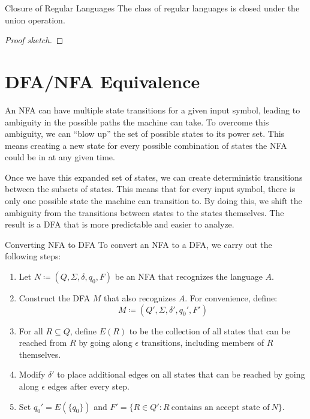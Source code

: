 \documentclass[12pt]{report}
\begin{document}
\begin{thmbox}{Closure of Regular Languages}{}
    The class of regular languages is closed under the union operation.
    \tcblower
    \begin{proof}[Proof sketch]
    \end{proof}
\end{thmbox}


\section{DFA/NFA Equivalence}

An NFA can have multiple state transitions for a given input symbol, leading to ambiguity in the possible paths the machine can take. To overcome this ambiguity, we can ``blow up'' the set of possible states to its power set. This means creating a new state for every possible combination of states the NFA could be in at any given time.

Once we have this expanded set of states, we can create deterministic transitions between the subsets of states. This means that for every input symbol, there is only one possible state the machine can transition to. By doing this, we shift the ambiguity from the transitions between states to the states themselves. The result is a DFA that is more predictable and easier to analyze.

\begin{tecbox}{Converting NFA to DFA}{}
    To convert an NFA to a DFA, we carry out the following steps:
    \begin{enumerate}
        \item Let $N \coloneq (Q, \Sigma, \delta, q_0, F)$ be an NFA that recognizes the language $A$.
        \item Construct the DFA $M$ that also recognizes $A$. For convenience, define:
        \[ M \coloneq (Q\prime, \Sigma, \delta\prime, q_0\prime, F\prime) \]
        \item For all $R \subseteq Q$, define $E(R)$ to be the collection of all states that can be reached from $R$ by going along $\epsilon$ transitions, including members of $R$ themselves.
        \item Modify $\delta\prime$ to place additional edges on all states that can be reached by going along $\epsilon$ edges after every step.
        \item Set $q_0\prime = E(\{q_0\})$ and $F\prime = \{ R \in Q\prime : R\ \text{contains an accept state of}\ N \}$.
    \end{enumerate}
\end{tecbox}
\end{document}
